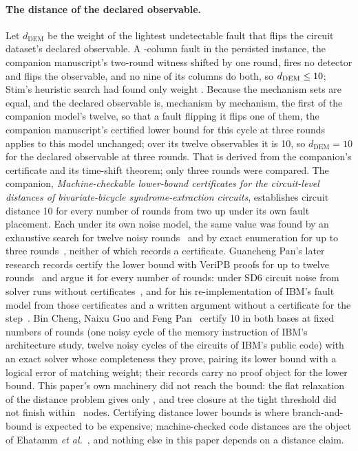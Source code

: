 \documentclass[aps,pra,twocolumn,superscriptaddress,nofootinbib,longbibliography,floatfix]{revtex4-2}
\begin{document}
\paragraph*{The distance of the declared observable.} Let $d_{\mathrm{DEM}}$ be the weight of the lightest undetectable fault that flips the circuit dataset's declared observable. A \EqWitnessWeight-column fault in the persisted instance, the companion manuscript's two-round witness shifted by one round, fires no detector and flips the observable, and no nine of its columns do both, so $d_{\mathrm{DEM}}\le10$; Stim's heuristic search had found only weight \DistUpper. Because the mechanism sets are equal, and the declared observable is, mechanism by mechanism, the first of the companion model's twelve, so that a fault flipping it flips one of them, the companion manuscript's certified lower bound for this cycle at three rounds applies to this model unchanged; over its twelve observables it is 10, so $d_{\mathrm{DEM}}=10$ for the declared observable at three rounds. That is derived from the companion's certificate and its time-shift theorem; only three rounds were compared. The companion, \emph{Machine-checkable lower-bound certificates for the circuit-level distances of bivariate-bicycle syndrome-extraction circuits}, establishes circuit distance 10 for every number of rounds from two up under its own fault placement. Each under its own noise model, the same value was found by an exhaustive search for twelve noisy rounds~\cite{crocker2026gross} and by exact enumeration for up to three rounds~\cite{pan2026interleaving}, neither of which records a certificate. Guancheng Pan's later research records certify the lower bound with VeriPB proofs for up to twelve rounds~\cite{pan2026e037} and argue it for every number of rounds: under SD6 circuit noise from solver runs without certificates~\cite{pan2026e043}, and for his re-implementation of IBM's fault model from those certificates and a written argument without a certificate for the step~\cite{pan2026e045}. Bin Cheng, Naixu Guo and Feng Pan~\cite{cheng2026certifying} certify 10 in both bases at fixed numbers of rounds (one noisy cycle of the memory instruction of IBM's architecture study, twelve noisy cycles of the circuits of IBM's public code) with an exact solver whose completeness they prove, pairing its lower bound with a logical error of matching weight; their records carry no proof object for the lower bound. This paper's own machinery did not reach the bound: the flat relaxation of the distance problem gives only \DistFlatBound, and tree closure at the tight threshold did not finish within \DistNodeBudget\ nodes. Certifying distance lower bounds is where branch-and-bound is expected to be expensive; machine-checked code distances are the object of Ehatamm \textit{et al.}~\cite{ehatamm2026end}, and nothing else in this paper depends on a distance claim.
\end{document}
